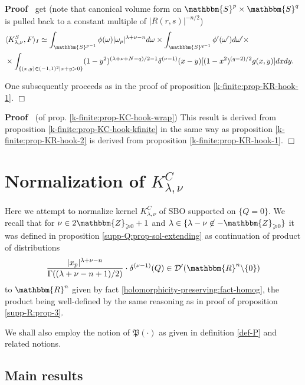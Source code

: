 \documentclass{article}
\newcommand{\nin}{\not\in}
\newcommand{\upl}{+}
\newenvironment{proof}{\noindent\textbf{Proof\ }}{\hspace*{\fill}$\Box$\medskip}
\numberwithin{definition}{section}
\numberwithin{lemma}{section}
\numberwithin{proposition}{section}
{\theorembodyfont{\rmfamily}\newtheorem{remark}{Remark}
\numberwithin{remark}{section}
}
\begin{document}
\begin{proof}
  get (note that canonical volume form on $\mathbbm{S}^p \times \mathbbm{S}^q$
  is pulled back to a constant multiple of $| R ( r, s) |^{- n / 2}$)
  \begin{eqnarray}
    & \langle K_{\lambda, \nu}^S, F \rangle_I \simeq \int_{\mathbbm{S}^{p -
    1}} \phi ( \omega) | \omega_p |^{\lambda + \nu - n} d \omega_{} \times
    \int_{\mathbbm{S}^{q - 1}} \phi' ( \omega') d \omega' \times & 
    \nonumber\\
    & \times \int_{\{ ( x, y) \in ( - 1, 1)^2 | x + y > 0 \}} ( 1 - y^2)^{(
    \lambda + \nu + N - q) / 2 - 1} \delta^{( \nu - 1)} ( x - y) [ ( 1 -
    x^2)^{( q - 2) / 2} g ( x, y)] d x d y. &  \nonumber
  \end{eqnarray}
  
  
  One subsequently proceeds as in the proof of proposition
  \ref{k-finite:prop-KR-hook-1}.
\end{proof}

\begin{proof}
  (of prop. \ref{k-finite:prop-KC-hook-wrap}) This result is derived from
  proposition \ref{k-finite:prop-KC-hook-kfinite} in the same way as
  proposition \ref{k-finite:prop-KR-hook-2} is derived from proposition
  \ref{k-finite:prop-KR-hook-1}.
\end{proof}

\section{Normalization of $K_{\lambda, \nu}^C$}\label{sec:KC-normalization}

Here we attempt to normalize kernel $K_{\lambda, \nu}^C$ of SBO supported on
$\{ Q = 0 \}$. We recall that for $\nu \in 2\mathbbm{Z}_{\geqslant 0} + 1$ and
$\lambda \in \{ \lambda - \nu \nin -\mathbbm{Z}_{\geqslant 0} \}$ it was
defined in proposition \ref{supp-Q:prop-sol-extending} as continuation of
product of distributions
\[ \frac{| x_p |^{\lambda + \nu - n}}{\Gamma ( ( \lambda + \nu - n \upl 1) /
   2)} \cdot \delta^{( \nu - 1)} ( Q) \in \mathcal{D}' ( \mathbbm{R}^n
   \backslash \{ 0 \}) \]
to $\mathbbm{R}^n$ given by fact \ref{holomorphicity-preserving:fact-homog},
the product being well-defined by the same reasoning as in proof of
proposition \ref{supp-R:prop-3}.

We shall also employ the notion of $\mathfrak{P} ( \cdot)$ as given in
definition \ref{def-P} and related notions.

\subsection{Main results}
\end{document}
